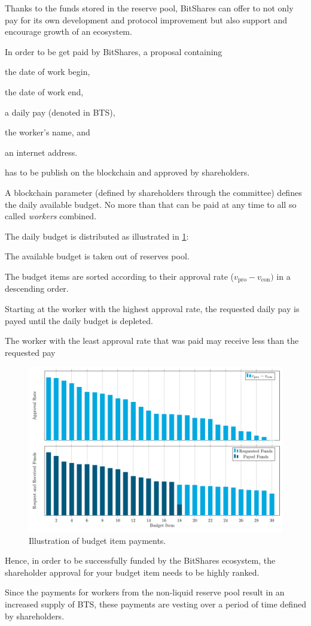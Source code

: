 Thanks to the funds stored in the reserve pool, BitShares can offer to not only
pay for its own development and protocol improvement but also support and
encourage growth of an ecosystem.

In order to be get paid by BitShares, a proposal containing
\begin{inparaenum}[(a)]
 \item the date of work begin,
 \item the date of work end,
 \item a daily pay (denoted in BTS),
 \item the worker's name, and
 \item an internet address.
\end{inparaenum}
has to be publish on the blockchain and approved by shareholders.

A blockchain parameter (defined by shareholders through the committee) defines
the daily available budget. No more than that can be paid at any time to all so
called \emph{workers} combined.

The daily budget is distributed as illustrated in \cref{fig:workerpayalgo}: 
\begin{inparaenum}[(1)]
 \item The available budget is taken out of reserves pool.
 \item The budget items are sorted according to their approval rate
       ($v_\text{pro}-v_\text{con})$ in a descending order.
 \item Starting at the worker with the highest approval rate, the requested
       daily pay is payed until the daily budget is depleted.
 \item The worker with the least approval rate that was paid may receive less
       than the requested pay
\end{inparaenum}

\begin{figure}[!htp]
 \centering
  \includegraphics[width=\linewidth]{figures/worker-pay-algo.pdf}\vspace*{-2ex}
 \caption{Illustration of budget item payments.}
 \label{fig:workerpayalgo}
\end{figure}
Hence, in order to be successfully funded by the BitShares ecosystem, the
shareholder approval for your budget item needs to be highly ranked.

Since the payments for workers from the non-liquid reserve pool result in an
increased supply of BTS, these payments are vesting over a period of time
defined by shareholders.
